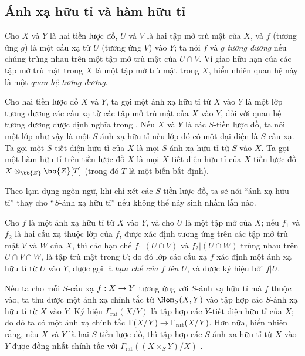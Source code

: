 \documentclass[oneside]{amsart}
\makeatletter
\newcommand{\ega@arrow}[2]{\mathchoice{#1}{#2}{#2}{#2}}
\renewcommand{\to}{\ega@arrow{\longrightarrow}{\rightarrow}}
\newcommand{\oldpage}[2][]{{\marginnote{\normalfont\textbf{#1}~|~#2}}\ignorespaces}
\let\EGAOriginalLabel\label
\renewcommand{\label}[1]{\phantomsection\EGAOriginalLabel{#1}}
\makeatother
\begin{document}
\subsection{Ánh xạ hữu tỉ và hàm hữu tỉ}
\label{subsection:I.7.1}

\begin{env}[7.1.1]
\label{I.7.1.1}
Cho $X$ và $Y$ là hai tiền lược đồ, $U$ và $V$ là hai tập mở trù mật của $X$, và $f$ (tương ứng $g$) là một cấu xạ từ $U$ (tương ứng $V$) vào $Y$; ta nói $f$ và $g$ \emph{tương đương} nếu chúng trùng nhau trên một tập mở trù mật của $U\cap V$.
Vì giao hữu hạn của các tập mở trù mật trong $X$ là một tập mở trù mật trong $X$, hiển nhiên quan hệ này là một \emph{quan hệ tương đương}.
\end{env}

\begin{definition}[7.1.2]
\label{I.7.1.2}
Cho hai tiền lược đồ $X$ và $Y$, ta gọi một ánh xạ hữu tỉ từ $X$ vào $Y$ là một lớp tương đương các cấu xạ từ các tập mở trù mật của $X$ vào $Y$, đối với quan hệ tương đương được định nghĩa trong .
Nếu $X$ và $Y$ là các $S$-tiền lược đồ, ta nói một lớp như vậy là một $S$-ánh xạ hữu tỉ nếu lớp đó có một đại diện là $S$-cấu xạ.
Ta gọi một $S$-tiết diện hữu tỉ của $X$ là mọi $S$-ánh xạ hữu tỉ từ $S$ vào $X$.
Ta gọi một hàm hữu tỉ trên tiền lược đồ $X$ là mọi $X$-tiết diện hữu tỉ của $X$-tiền lược đồ $X\otimes_{\bb{Z}}\bb{Z}[T]$ (trong đó $T$ là một biến bất định).

Theo lạm dụng ngôn ngữ, khi chỉ xét các $S$-tiền lược đồ, ta sẽ nói ``ánh xạ hữu tỉ'' thay cho ``$S$-ánh xạ hữu tỉ'' nếu không thể nảy sinh nhầm lẫn nào.

Cho $f$ là một ánh xạ hữu tỉ từ $X$ vào $Y$, và cho $U$ là một tập mở của $X$; nếu $f_1$ và $f_2$ là hai cấu xạ thuộc lớp của $f$, được xác định tương ứng trên các tập mở trù mật $V$ và $W$ của $X$, thì các hạn chế $f_1|(U\cap V)$ và $f_2|(U\cap W)$ trùng nhau trên $U\cap V\cap W$, là tập trù mật trong $U$; do đó lớp các cấu xạ $f$ xác định một ánh xạ hữu tỉ từ $U$ vào $Y$, được gọi là \emph{hạn chế của $f$ lên $U$}, và được ký hiệu bởi $f|U$.

Nếu ta cho mỗi $S$-cấu xạ $f:X\to Y$ tương ứng với $S$-ánh xạ hữu tỉ
\oldpage[I]{156}
mà $f$ thuộc vào, ta thu được một ánh xạ chính tắc từ $\Hom_S(X,Y)$ vào tập hợp các $S$-ánh xạ hữu tỉ từ $X$ vào $Y$.
Ký hiệu $\Gamma_\mathrm{rat}(X/Y)$ là tập hợp các $Y$-tiết diện hữu tỉ của $X$; do đó ta có một ánh xạ chính tắc $\Gamma(X/Y)\to\Gamma_\mathrm{rat}(X/Y)$.
Hơn nữa, hiển nhiên rằng, nếu $X$ và $Y$ là hai $S$-tiền lược đồ, thì tập hợp các $S$-ánh xạ hữu tỉ từ $X$ vào $Y$ được đồng nhất chính tắc với $\Gamma_\mathrm{rat}((X\times_S Y)/X)$ .
\end{definition}
\end{document}
